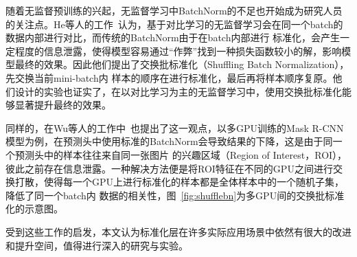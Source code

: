 随着无监督预训练的兴起，无监督学习中BatchNorm的不足也开始成为研究人员的关注点。He等人的工作~\citep{he2020momentum}认为，基于对比学习的无监督学习会在同一个batch的数据内部进行对比，而传统的BatchNorm由于在batch内部进行
标准化，会产生一定程度的信息泄露，使得模型容易通过“作弊”找到一种损失函数较小的解，影响模型最终的效果。因此他们提出了交换批标准化（Shuffling Batch Normalization），先交换当前mini-batch内
样本的顺序在进行标准化，最后再将样本顺序复原。他们设计的实验也证实了，在以对比学习为主的无监督学习中，使用交换批标准化能够显著提升最终的效果。

同样的，在Wu等人的工作中~\citep{wu2021rethinking}也提出了这一观点，以多GPU训练的Mask R-CNN模型为例，在预测头中使用标准的BatchNorm会导致结果的下降，这是由于同一个预测头中的样本往往来自同一张图片
的兴趣区域（Region of Interest，ROI），彼此之前存在信息泄露。一种解决方法便是将ROI特征在不同的GPU之间进行交换打散，使得每一个GPU上进行标准化的样本都是全体样本中的一个随机子集，降低了同一个batch内
数据的相关性，图~\ref{fig:shufflebn}为多GPU间的交换批标准化的示意图。

受到这些工作的启发，本文认为标准化层在许多实际应用场景中依然有很大的改进和提升空间，值得进行深入的研究与实验。
